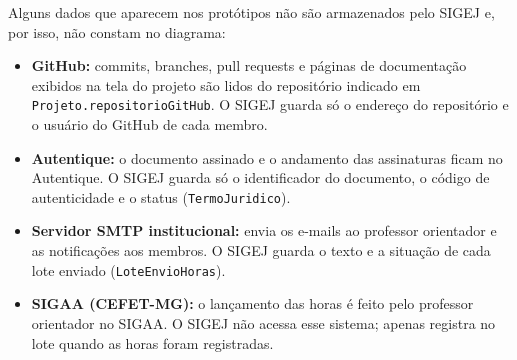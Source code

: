 Alguns dados que aparecem nos protótipos não são armazenados pelo SIGEJ e, por isso, não constam no diagrama:

\begin{itemize}
    \item \textbf{GitHub:} commits, branches, pull requests e páginas de documentação exibidos na tela do projeto são lidos do repositório indicado em \texttt{Projeto.repositorioGitHub}. O SIGEJ guarda só o endereço do repositório e o usuário do GitHub de cada membro.
    \item \textbf{Autentique:} o documento assinado e o andamento das assinaturas ficam no Autentique. O SIGEJ guarda só o identificador do documento, o código de autenticidade e o status (\texttt{TermoJuridico}).
    \item \textbf{Servidor SMTP institucional:} envia os e-mails ao professor orientador e as notificações aos membros. O SIGEJ guarda o texto e a situação de cada lote enviado (\texttt{LoteEnvioHoras}).
    \item \textbf{SIGAA (CEFET-MG):} o lançamento das horas é feito pelo professor orientador no SIGAA. O SIGEJ não acessa esse sistema; apenas registra no lote quando as horas foram registradas.
\end{itemize}

\clearpage

